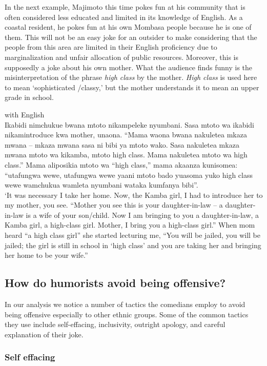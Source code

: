 \documentclass[output=paper]{langsci/langscibook}
\begin{document}
In the next example, Majimoto this time pokes fun at his community that is often considered less educated and limited in its knowledge of English. As a coastal resident, he pokes fun at his own Mombasa people because he is one of them. This will not be an easy joke for an outsider to make considering that the people from this area are limited in their English proficiency due to marginalization and unfair allocation of public resources. Moreover, this is supposedly a joke about his own mother. What the audience finds funny is the misinterpretation of the phrase \textit{high class} by the mother. \textit{High class} is used here to mean ‘sophisticated /classy,’ but the mother understands it to mean an upper grade in school. 

\ea {} with English\\
\smallskip
 Ikabidi nimchukue bwana mtoto nikampeleke nyumbani. Sasa mtoto wa  ikabidi nikamintroduce kwa mother, unaona. “Mama waona bwana nakuletea mkaza mwana – mkaza mwana sasa ni bibi ya mtoto wako. Sasa nakuletea mkaza mwana mtoto wa kikamba, mtoto high class. Mama nakuletea mtoto wa high class.” Mama aliposikia mtoto wa “high class,” mama akaanza kunisomea: “utafungwa wewe, utafungwa wewe yaani mtoto bado yuasoma yuko high class wewe wamchukua wamleta nyumbani wataka kumfanya bibi”.\\
\glt ‘It was necessary I take her home. Now, the Kamba girl, I had to introduce her to my mother, you see. “Mother you see this is your daughter-in-law – a daughter-in-law is a wife of your son/child. Now I am bringing to you a daughter-in-law, a Kamba girl, a high-class girl. Mother, I bring you a high-class girl.” When mom heard “a high class girl” she started lecturing me, “You will be jailed, you will be jailed; the girl is still in school in `high class' and you are taking her and bringing her home to be your wife.” \citep{ChurchillShow2015}
\z

\subsection{How do humorists avoid being offensive? }

In our analysis we notice a number of tactics the comedians employ to avoid being offensive especially to other ethnic groups. Some of the common tactics they use include self-effacing, inclusivity, outright apology, and careful explanation of their joke.

\subsubsection{Self effacing}
\end{document}
